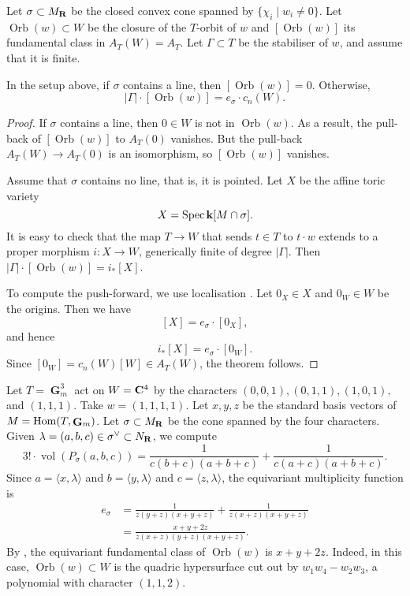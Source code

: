 \documentclass{amsart}
\renewcommand{\k}{\mathbf k}
\DeclareMathOperator{\G}{\mathbf G}
\DeclareMathOperator{\Orb}{Orb}
\begin{document}
 Let \(\sigma \subset M_{{\bf R}}\) be the closed convex cone spanned by \(\{\chi_i \mid w_i \neq 0\}\).
 Let \(\Orb(w) \subset W\) be the closure of the \(T\)-orbit of \(w\) and \([\Orb(w)]\) its fundamental class in \(A_{T}(W) = A_{T}\).
 Let \(\Gamma \subset T\) be the stabiliser of \(w\), and assume that it is finite.
 \begin{theorem}\label{thm:torus}
   In the setup above, if \(\sigma\) contains a line, then \([\Orb(w)] = 0\).
   Otherwise,
   \[ |\Gamma| \cdot [\Orb(w)] = e_{\sigma} \cdot c_n(W).\]
 \end{theorem}
 \begin{proof}
   If \(\sigma\) contains a line, then \(0 \in W\) is not in \(\Orb(w)\).
   As a result, the pull-back of \([\Orb(w)]\) to \(A_{T}(0)\) vanishes.
   But the pull-back \(A_T(W) \to A_T(0)\) is an isomorphism, so \([\Orb(w)]\) vanishes.

   Assume that \(\sigma\) contains no line, that is, it is pointed.
   Let \(X\) be the affine toric variety
   \[ X = \spec \k[M \cap \sigma].\]
   It is easy to check that the map \(T \to W\) that sends \(t \in T\) to \(t \cdot w\) extends to a proper morphism \(i \colon X \to W\), generically finite of degree \(|\Gamma|\).
   Then \(|\Gamma| \cdot [\Orb(w)] = i_{*}[X]\).

   To compute the push-forward, we use localisation \cite[\S~4.2 Corollary]{bri:97}.
   Let \(0_X \in X\) and \(0_W \in W\) be the origins.
   Then we have
   \[ [X] = e_{\sigma} \cdot [0_X],\]
   and hence
   \[ i_{*}[X] = e_{\sigma} \cdot [0_W].\]
   Since \([0_{W}] = c_{n}(W)[W]\in A_{T}(W)\), the theorem follows.
 \end{proof}

 \begin{example}
   Let \(T = \G_m^3\) act on \(W = {\bf C}^{4}\) by the characters \((0,0,1), (0,1,1), (1,0,1),\) and \((1,1,1)\).
   Take \(w = (1,1,1,1)\).
   Let \(x,y,z\) be the standard basis vectors of \(M=\Hom(T,\G_m)\).
   Let \(\sigma \subset M_{{\bf R}}\) be the cone spanned by the four characters.
   Given \(\lambda = (a,b,c) \in \sigma^{\vee} \subset N_{{\bf R}}\), we compute
   \[ 3! \cdot \operatorname{vol}(P_{\sigma}(a,b,c)) = \frac{1}{c(b+c)(a+b+c)} + \frac{1}{c(a+c)(a+b+c)}.\]
   Since \(a = \langle x, \lambda \rangle\) and \(b = \langle  y, \lambda \rangle\) and \(c = \langle z, \lambda \rangle\), the equivariant multiplicity function is
   \begin{align*}
     e_{\sigma} &= \frac{1}{z(y+z)(x+y+z)} + \frac{1}{z(x+z)(x+y+z)}\\
&= \frac{x+y+2z}{z(x+z)(y+z)(x+y+z)}.                  
   \end{align*}
   By , the equivariant fundamental class of \(\Orb(w)\) is \(x+y+2z\).
   Indeed, in this case, \(\Orb(w) \subset W\) is the quadric hypersurface cut out by \(w_1w_4-w_2w_3\), a polynomial with character \((1,1,2)\).
 \end{example}
 
\end{document}
